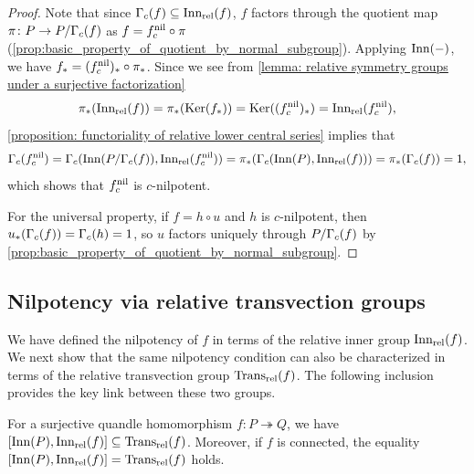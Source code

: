 \begin{proof}
    Note that since $\relInnLCS{c}{f}\subseteq \relInn(f)$, $f$ factors through the quotient map $\pi\colon P\to P/\relInnLCS{c}{f}$ as $f=\nilpTrunc{c}{f}\circ \pi$ (\cref{prop:basic_property_of_quotient_by_normal_subgroup}). Applying $\Inn(-)$, we have $f_*= (\nilpTrunc{c}{f})_*\circ \pi_*$. Since we see from \cref{lemma: relative symmetry groups under a surjective factorization}
    \[\pi_*(\relInn(f))=\pi_*(\Ker(f_*))= \Ker((\nilpTrunc{c}{f})_*)= \relInn(\nilpTrunc{c}{f}), \]
    \cref{proposition: functoriality of relative lower central series} implies that
    \[ \relInnLCS{c}{\nilpTrunc{c}{f}} = \relLCS_c(\Inn(P/\relInnLCS{c}{f}),\relInn(\nilpTrunc{c}{f})) = \pi_*( \relLCS_c(\Inn(P),\relInn(f)))=\pi_*(\relInnLCS{c}{f}) =1, \]
    which shows that $\nilpTrunc{c}{f}$ is $c$-nilpotent.
    
    For the universal property, if $f=h \circ u$ and $h$ is $c$-nilpotent, then $u_*(\relInnLCS{c}{f})=\relInnLCS{c}{h}=1$, so $u$ factors uniquely through $P/\relInnLCS{c}{f}$ by \cref{prop:basic_property_of_quotient_by_normal_subgroup}.
\end{proof}




\subsection{Nilpotency via relative transvection groups}
\label{subsection: Nilpotency via relative transvections and adjoint groups}


We have defined the nilpotency of $f$ in terms of the relative inner group $\relInn(f)$. We next show that the same nilpotency condition can also be characterized in terms of the relative transvection group $\relTrans(f)$. The following inclusion provides the key link between these two groups.

\begin{lem}
\label{lem:commutator_inn_rel_trans_rel}
    For a surjective quandle homomorphism $f \colon P \twoheadrightarrow Q$, we have $[\Inn(P), \relInn(f)] \subseteq \relTrans(f)$.
    Moreover, if $f$ is connected, the equality $[\Inn(P), \relInn(f)] = \relTrans(f)$ holds.
\end{lem}


